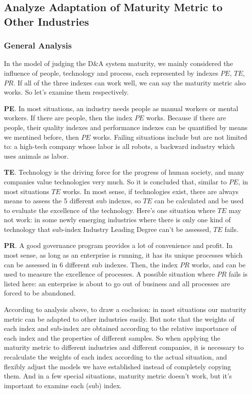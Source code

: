 \documentclass{mcmthesis}
\begin{document}
\subsection{Analyze Adaptation of Maturity Metric to Other Industries}
\subsubsection{General Analysis}
In the model of judging the D\&A system maturity, we mainly considered the influence of people, technology and process, each represented by indexes $PE$, $TE$, $PR$. If all of the three indexes can work well, we can say the maturity metric also works. So let's examine them respectively.

\textbf{PE}. In most situations, an industry needs people as manual workers or mental workers. If there are people, then the index $PE$ works. Because if there are people, their quality indexes and performance indexes can be quantified by means we mentined before, then $PE$ works. Failing situations include but are not limited to: a high-tech company whose labor is all robots, a backward industry which uses animals as labor.

\textbf{TE}. Technology is the driving force for the progress of human society, and many companies value technologies very much. So it is concluded that, similar to $PE$, in most situations $TE$ works. In most sense, if technologies exist, there are always means to assess the 5 different sub indexes, so $TE$ can be calculated and be used to evaluate the excellence of the technology. Here's one situation where $TE$ may not work: in some newly emerging industries where there is only one kind of technology that sub-index Industry Leading Degree can't be assessed, $TE$ fails.

\textbf{PR}. A good governance program provides a lot of convenience and profit. In most sense, as long as an enterprise is running, it has its unique processes which can be assessed in 6 different sub indexes. Then, the index $PR$ works, and can be used to measure the excellence of processes. A possible situation where $PR$ fails is listed here: an enterprise is about to go out of business and all processes are forced to be abandoned.

According to analysis above, to draw a coclusion: in most situations our maturity metric can be adapted to other industries easily. But note that the weights of each index and sub-index are obtained according to the relative importance of each index and the properties of different samples. So when applying the maturity metric to different industries and different companies, it is necessary to recalculate the weights of each index according to the actual situation, and flexibly adjust the models we have established instead of completely copying them. And in a few special situations, maturity metric doesn't work, but it's important to examine each (sub) index.
\end{document}
